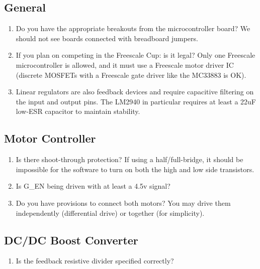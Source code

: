 \documentclass{article}
\begin{document}
\subsection{General}
\begin{enumerate}
  \item Do you have the appropriate breakouts from the microcontroller board? We should not see boards connected with breadboard jumpers.
  \item If you plan on competing in the Freescale Cup: is it legal? Only one Freescale microcontroller is allowed, and it must use a Freescale motor driver IC (discrete MOSFETs with a Freescale gate driver like the MC33883 is OK).
  \item Linear regulators are also feedback devices and require capacitive filtering on the input and output pins. The LM2940 in particular requires at least a 22uF low-ESR capacitor to maintain stability.
\end{enumerate}

\subsection{Motor Controller}
\begin{enumerate}
  \item Is there shoot-through protection? If using a half/full-bridge, it should be impossible for the software to turn on both the high and low side transistors.
  \item Is G\_EN being driven with at least a 4.5v signal?
  \item Do you have provisions to connect both motors? You may drive them independently (differential drive) or together (for simplicity).
\end{enumerate}

\subsection{DC/DC Boost Converter}
\begin{enumerate}
  \item Is the feedback resistive divider specified correctly?
\end{enumerate}
\end{document}
